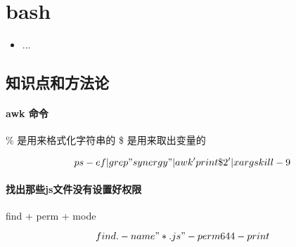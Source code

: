\chapter{bash}
\label{chap1}
\begin{itemize}[noitemsep,topsep=0pt,parsep=0pt,partopsep=0pt]
	\item ...
\end{itemize}

\section{知识点和方法论}

\subsubsection{awk 命令}
\% 是用来格式化字符串的
\$ 是用来取出变量的

$$
	ps -ef | grep "synergy" | awk 'print \$2' | xargs kill -9
$$

\subsubsection{找出那些js文件没有设置好权限}

find + perm + mode

$$
	find . -name "*.js" -perm 644 -print
$$